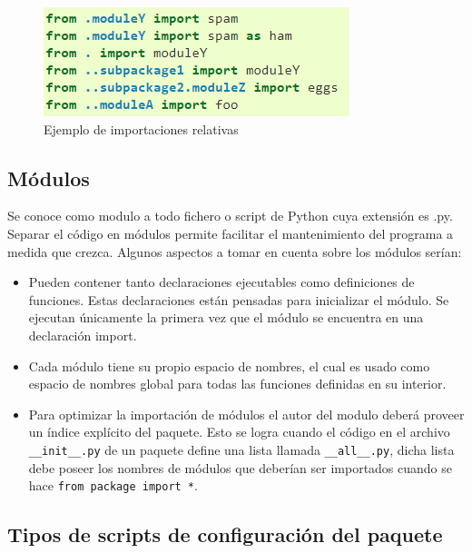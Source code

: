 \begin{itemize}
\begin{figure}[H]
    \centering
    \includegraphics{Recursos/importarRelativamente.png}
    \caption{Ejemplo de importaciones relativas}
    \label{importarIR}
\end{figure}
\end{itemize}
\subsection{Módulos}
Se conoce como modulo a todo fichero o script de Python cuya extensión es .py. Separar el código en módulos permite facilitar el mantenimiento del programa a medida que crezca. Algunos aspectos a tomar en cuenta sobre los módulos serían:
\begin{itemize}
    \item Pueden contener tanto declaraciones ejecutables como definiciones de funciones. Estas declaraciones están pensadas para inicializar el módulo. Se ejecutan únicamente la primera vez que el módulo se encuentra en una declaración import\cite{ModuloPython}.
    \item Cada módulo tiene su propio espacio de nombres, el cual es usado como espacio de nombres global para todas las funciones definidas en su interior.
    \item Para optimizar la importación de módulos el autor del modulo deberá proveer un índice explícito del paquete. Esto se logra cuando el código en el archivo \texttt{__init__.py} de un paquete define una lista llamada \texttt{__all__.py}, dicha lista debe poseer los nombres de módulos que deberían ser importados cuando se hace \texttt{from package import *}\cite{ModuloPython}.
\end{itemize}
\subsection{Tipos de  scripts de configuración del paquete}

